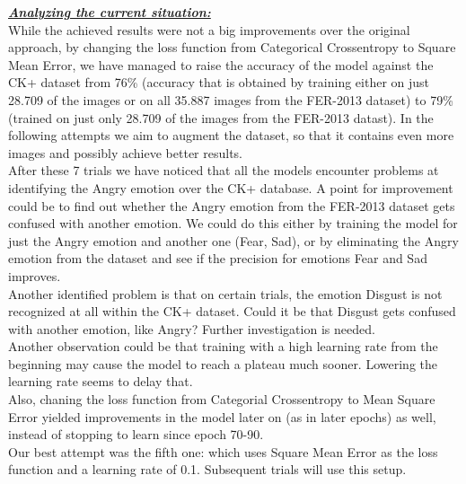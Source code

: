 \documentclass[runningheads,a4paper,11pt]{report}
\begin{document}
\clearpage
\underline{\textbf{\emph{Analyzing the current situation:}}}\\
While the achieved results were not a big improvements over the original approach, by changing the loss function from Categorical Crossentropy to Square Mean Error, we have managed to raise the accuracy of the model against the CK+ dataset from 76\% (accuracy that is obtained by training either on just 28.709 of the images or on all 35.887 images from the FER-2013 dataset) to 79\% (trained on just only 28.709 of the images from the FER-2013 datast). In the following attempts we aim to augment the dataset, so that it contains even more images and possibly achieve better results.\\
After these 7 trials we have noticed that all the models encounter problems at identifying the Angry emotion over the CK+ database. A point for improvement could be to find out whether the Angry emotion from the FER-2013 dataset gets confused with another emotion. We could do this either by training the model for just the Angry emotion and another one (Fear, Sad), or by eliminating the Angry emotion from the dataset and see if the precision for emotions Fear and Sad improves.\\
Another identified problem is that on certain trials, the emotion Disgust is not recognized at all within the CK+ dataset. Could it be that Disgust gets confused with another emotion, like Angry? Further investigation is needed.\\
Another observation could be that training with a high learning rate from the beginning may cause the model to reach a plateau much sooner. Lowering the learning rate seems to delay that.\\
Also, chaning the loss function from Categorial Crossentropy to Mean Square Error yielded improvements in the model later on (as in later epochs) as well, instead of stopping to learn since epoch 70-90.\\
Our best attempt was the fifth one: which uses Square Mean Error as the loss function and a learning rate of 0.1. Subsequent trials will use this setup.\\

\clearpage
\end{document}
